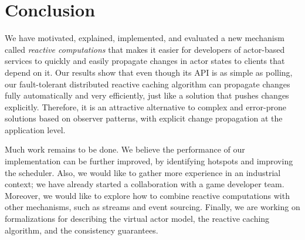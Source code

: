\section{Conclusion}

We have motivated, explained, implemented, and evaluated a new mechanism called \emph{reactive computations} that makes it easier for developers of actor-based services to quickly and easily propagate changes in actor states to clients that depend on it. Our results show that even though its API is as simple as polling, our fault-tolerant distributed reactive caching algorithm can propagate changes fully automatically and very efficiently, just like a solution that pushes changes explicitly. Therefore, it is an attractive alternative to complex and error-prone solutions based on observer patterns, with explicit change propagation at the application level.

Much work remains to be done. We believe the performance of our implementation can be further improved, by identifying hotspots and improving the scheduler. Also, we would like to gather more experience in an industrial context; we have already started a collaboration with a game developer team. Moreover, we would like to explore how to combine reactive computations with other mechanisms, such as streams and event sourcing. Finally, we are working on formalizations for describing the virtual actor model, the reactive caching algorithm, and the consistency guarantees.